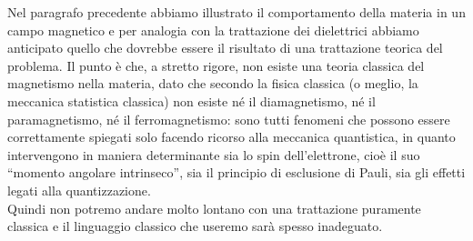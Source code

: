 Nel paragrafo precedente abbiamo illustrato il comportamento della materia in un
campo magnetico e per analogia con la trattazione dei dielettrici abbiamo
anticipato quello che dovrebbe essere il risultato di una trattazione teorica
del problema. Il punto \`e che, a stretto rigore, non esiste una teoria classica
del magnetismo nella materia, dato che secondo la fisica classica (o meglio, la
meccanica statistica classica) non esiste n\'e il diamagnetismo, n\'e il
paramagnetismo, n\'e il ferromagnetismo: sono tutti fenomeni che possono essere
correttamente spiegati solo facendo ricorso alla meccanica quantistica, in
quanto intervengono in maniera determinante sia lo spin dell'elettrone, cio\`e
il suo ``momento angolare intrinseco'', sia il principio di esclusione di Pauli,
sia gli effetti legati alla quantizzazione.\\
Quindi non potremo andare molto lontano con una trattazione puramente classica e
il linguaggio classico che useremo sar\`a spesso inadeguato.

